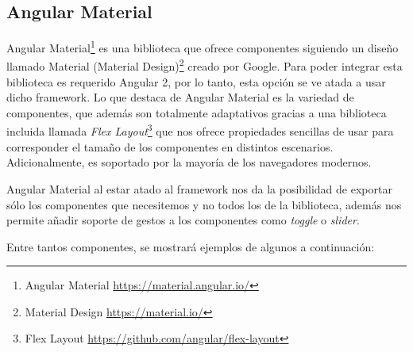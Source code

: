 \subsection{Angular Material}

Angular Material\footnote{Angular Material \url{https://material.angular.io/}} es una biblioteca que ofrece componentes siguiendo un diseño llamado Material (Material Design)\footnote{Material Design \url{https://material.io/}} creado por Google. Para poder integrar esta biblioteca es requerido Angular 2, por lo tanto, esta opción se ve atada a usar dicho framework. Lo que destaca de Angular Material es la variedad de componentes, que además son totalmente adaptativos gracias a una biblioteca incluida llamada \textit{Flex Layout}\footnote{Flex Layout \url{https://github.com/angular/flex-layout}} que nos ofrece propiedades sencillas de usar para corresponder el tamaño de los componentes en distintos escenarios. Adicionalmente, es soportado por la mayoría de los navegadores modernos.

Angular Material al estar atado al framework nos da la posibilidad de exportar sólo los componentes que necesitemos y no todos los de la biblioteca, además nos permite añadir soporte de gestos a los componentes como \textit{toggle} o \textit{slider}.

Entre tantos componentes, se mostrará ejemplos de algunos a continuación:

